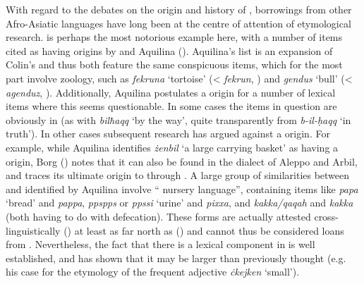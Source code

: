 \documentclass[output=paper]{langsci/langscibook}
\begin{document}

With regard to the debates on the origin and history of , borrowings from other Afro-Asiatic languages have long been at the centre of attention of  etymological research.  is perhaps the most notorious example here, with a number of items cited as having  origins by \cite{colin1957} and Aquilina (\citeyear[25--39]{aquilina1976}). Aquilina's list is an expansion of Colin's and thus both feature the same conspicuous items, which for the most part involve zoology, such as \textit{fekruna} `tortoise' (< \textit{fekrun}, \citealt[553]{naitzerrad2002}) and \textit{gendus} `bull' (< \textit{agenduz}, \citealt[827]{naitzerrad2002}).
Additionally, Aquilina postulates a  origin for a number of lexical items where this seems questionable. In some cases the items in question are obviously   in  (as with \textit{bilħaqq} `by the way', quite transparently from  \textit{b-il-\d{h}aqq} `in truth'). In other cases subsequent research has argued against a  origin. For example, while Aquilina identifies \textit{żenbil} `a large carrying basket' as having a  origin, Borg (\citeyear[261]{Borg2004}) notes that it can also be found in the  dialect of Aleppo and Arbil, and traces its ultimate origin to  through . A large group of similarities between  and  identified by Aquilina involve `` nursery language'', containing items like  \textit{papa} `bread' and  \textit{pappa},  \textit{ppspps} or \textit{ppssi} `urine' and  \textit{pixxa}, and  \textit{kakka/qaqah} and  \textit{kakka} (both having to do with defecation). These forms are actually attested cross-linguistically (\citealt{ferguson1964}) at least as far north as  (\citealt{ondrackova2010}) and cannot thus be considered loans from . Nevertheless, the fact that there is a  lexical component in  is well established, and \cite{Souag2018berber} has shown that it may be larger than previously thought (e.g. his case for the  etymology of the frequent adjective \textit{ċkejken} `small').
\end{document}
